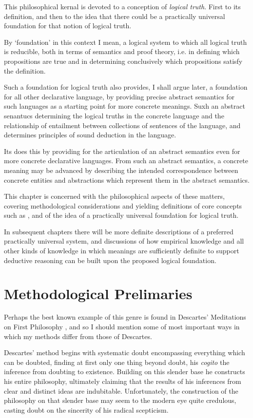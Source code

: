 
This philosophical kernal is devoted to a conception of \emph{logical truth}.
First to its definition, and then to the idea that there could be a practically universal foundation for that notion of logical truth.

By `foundation' in this context I mean, a logical system to which all logical truth is reducible, both in terms of semantics and proof theory, i.e. in defining which propositions are true and in determining conclusively which propositions satisfy the definition.

Such a foundation for logical truth also provides, I shall argue later, a foundation for all other declarative language, by providing precise abstract semantics for such languages as a starting point for more concrete meanings.
Suxh an abstract senantucs determining the logical truths in the concrete language and  the relationship of entailment between collections of sentences of the language, and determines principles of sound deduction in the language.

Its does this by providing for the articulation of an abstract semantics even for more concrete declarative languages.
From such an abstract semantics, a concrete meaning may be advanced by describing the intended correspondence between concrete entities and abstractions which represent them in the abstract semantics.

This chapter is concerned with the philosophical aspects of these matters, covering methodological considerations and yielding definitions of core concepts such as , and of the idea of a practically universal foundation for logical truth.

In subsequent chapters there will be more definite descriptions of a preferred practically universal system, and discussions of how empirical knowledge and all other kinds of knowledge in which meanings are sufficiently definite to support deductive reasoning can be built upon the proposed logical foundation.

\section{Methodological Prelimaries}

Perhaps the best known example of this genre is found in Descartes' Meditations on First Philosophy \cite{descartes2013meditations}, and so I should mention some of most important ways in which my methods differ from those of Descartes.

Descartes' method begins with systematic doubt encompassing everything which can be doubted, finding at first only one thing beyond doubt, his \emph{cogito} the inference from doubting to existence.
Building on this slender base he constructs his entire philosophy, ultimately claiming that the results of his inferences from clear and distinct ideas are indubitable.
Unfortunately, the construction of the philosophy on that slender base may seem to the modern eye quite credulous, casting doubt on the sincerity of his radical scepticism.

